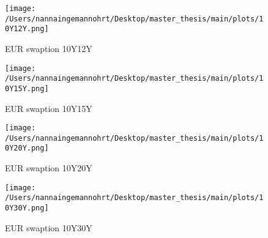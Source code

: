 \begin{figure}[H]
    \centering
    \begin{minipage}{0.5\textwidth}
        \texttt{[image: /Users/nannaingemannohrt/Desktop/master\_thesis/main/plots/10Y12Y.png]}
        \caption{EUR swaption 10Y12Y}
        \label{fig:10Y12Y}
    \end{minipage}\hfill 
    \begin{minipage}{0.5\textwidth}
        \texttt{[image: /Users/nannaingemannohrt/Desktop/master\_thesis/main/plots/10Y15Y.png]}
        \caption{EUR swaption 10Y15Y}
        \label{fig:10Y15Y}
    \end{minipage}

    \centering
    \begin{minipage}{0.5\textwidth}
        \texttt{[image: /Users/nannaingemannohrt/Desktop/master\_thesis/main/plots/10Y20Y.png]}
        \caption{EUR swaption 10Y20Y}
        \label{fig:10Y20Y}
    \end{minipage}\hfill 
    \begin{minipage}{0.5\textwidth}
        \texttt{[image: /Users/nannaingemannohrt/Desktop/master\_thesis/main/plots/10Y30Y.png]}
        \caption{EUR swaption 10Y30Y}
        \label{fig:10Y30Y}
    \end{minipage}
\end{figure}


    